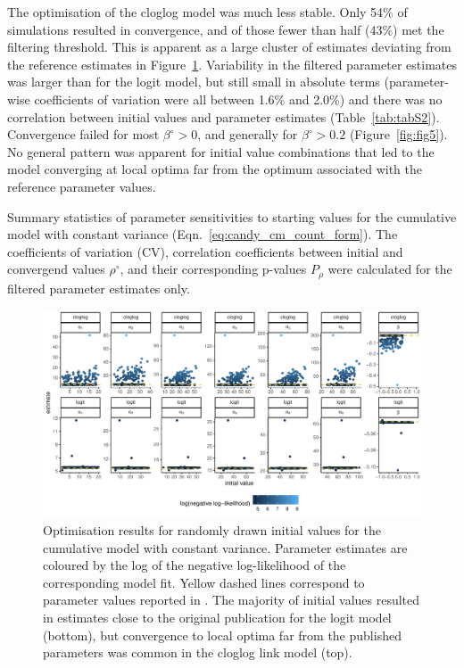 The optimisation of the cloglog model was much less stable. Only 54\% of simulations resulted in convergence, and of those fewer than half (43\%) met the filtering threshold. This is apparent as a large cluster of estimates deviating from the reference estimates in Figure~\ref{fig:fig3}. Variability in the filtered parameter estimates was larger than for the logit model, but still small in absolute terms (parameter-wise coefficients of variation were all between 1.6\% and 2.0\%) and there was no correlation between initial values and parameter estimates (Table~\ref{tab:tabS2}). Convergence failed for most $\beta^{\circ}>0$, and generally for $\beta^{\circ}>0.2$ (Figure~\ref{fig:fig5}). No general pattern was apparent for initial value combinations that led to the model converging at local optima far from the optimum associated with the reference parameter values.


\begin{table}[bph]
  \small
    \centering
    \caption{Summary statistics of parameter sensitivities to starting values for the cumulative model with constant variance (Eqn.~\ref{eq:candy_cm_count_form}). The coefficients of variation (CV), correlation coefficients between initial and convergend values $\rho^{\circ}$, and their corresponding p-values $P_\rho$ were calculated for the filtered parameter estimates only.
    }
  
  \label{tab:tabS2}
\end{table}


\begin{figure}[htbp]
  \centering
  \includegraphics[width=\textwidth]{../figures/figS1_initial_value_sensitivity_unfiltered.pdf}
  \caption{Optimisation results for randomly drawn initial values for the cumulative model with constant variance. Parameter estimates are coloured by the log of the negative log-likelihood of the corresponding model fit. Yellow dashed lines correspond to parameter values reported in \citep{candy1991modeling}. The majority of initial values resulted in estimates close to the original publication for the logit model (bottom), but convergence to local optima far from the published parameters was common in the cloglog link model (top).}
  \label{fig:fig3}
\end{figure} 

